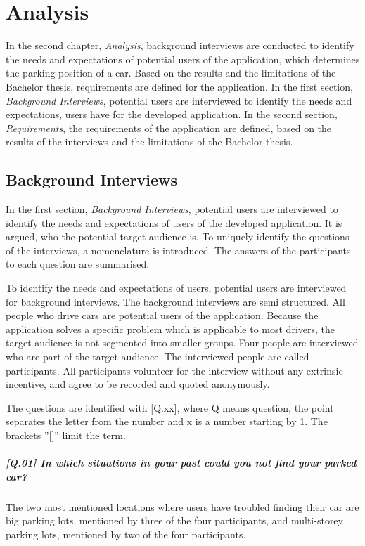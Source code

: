 \chapter{Analysis}
In the second chapter, \textit{Analysis}, background interviews are conducted to identify the needs and expectations of potential users of the application, which determines the parking position of a car. Based on the results and the limitations of the Bachelor thesis, requirements are defined for the application.
In the first section, \textit{Background Interviews}, potential users are interviewed to identify the needs and expectations, users have for the developed application.
In the second section, \textit{Requirements}, the requirements of the application are defined, based on the results of the interviews and the limitations of the Bachelor thesis.

\section{Background Interviews}
In the first section, \textit{Background Interviews}, potential users are interviewed to identify the needs and expectations of  users of the developed application. It is argued, who the potential target audience is. To uniquely identify the questions of the interviews, a nomenclature is introduced. The answers of the participants to each question are summarised.

To identify the needs and expectations of users, potential users are interviewed for background interviews. The background interviews are semi structured. All people who drive cars are potential users of the application. Because the application solves a specific problem which is applicable to most drivers, the target audience is not segmented into smaller groups. Four people are interviewed who are part of the target audience. The interviewed people are called participants. All participants volunteer for the interview without any extrinsic incentive, and agree to be recorded and quoted anonymously. \cite{Abras2004} \cite{wilson2013interview}

The questions are identified with [Q.xx], where Q means question, the point separates the letter from the number and x is a number starting by 1. The brackets ''[]'' limit the term.

\paragraph{[Q.01] In which situations in your past could you not find your parked car?}
The two most mentioned locations where users have troubled finding their car are big parking lots, mentioned by three of the four participants, and multi-storey parking lots, mentioned by two of the four participants.

